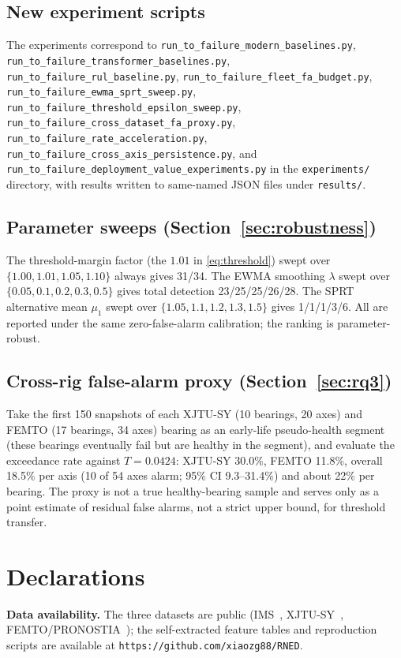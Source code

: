 \documentclass[journal]{IEEEtran}
\begin{document}
\subsection*{New experiment scripts}
The experiments correspond to \texttt{run\_to\_failure\_modern\_baselines.py}, \texttt{run\_to\_failure\_transformer\_baselines.py}, \texttt{run\_to\_failure\_rul\_baseline.py}, \texttt{run\_to\_failure\_fleet\_fa\_budget.py}, \texttt{run\_to\_failure\_ewma\_sprt\_sweep.py}, \texttt{run\_to\_failure\_threshold\_epsilon\_sweep.py}, \texttt{run\_to\_failure\_cross\_dataset\_fa\_proxy.py}, \texttt{run\_to\_failure\_rate\_acceleration.py}, \texttt{run\_to\_failure\_cross\_axis\_persistence.py}, and \texttt{run\_to\_failure\_deployment\_value\_experiments.py} in the \texttt{experiments/} directory, with results written to same-named JSON files under \texttt{results/}.

\subsection*{Parameter sweeps (Section~\ref{sec:robustness})}
The threshold-margin factor (the $1.01$ in \eqref{eq:threshold}) swept over $\{1.00,1.01,1.05,1.10\}$ always gives 31/34. The EWMA smoothing $\lambda$ swept over $\{0.05,0.1,0.2,0.3,0.5\}$ gives total detection 23/25/25/26/28. The SPRT alternative mean $\mu_1$ swept over $\{1.05,1.1,1.2,1.3,1.5\}$ gives 1/1/1/3/6. All are reported under the same zero-false-alarm calibration; the ranking is parameter-robust.

\subsection*{Cross-rig false-alarm proxy (Section~\ref{sec:rq3})}
Take the first 150 snapshots of each XJTU-SY (10 bearings, 20 axes) and FEMTO (17 bearings, 34 axes) bearing as an early-life pseudo-health segment (these bearings eventually fail but are healthy in the segment), and evaluate the exceedance rate against $T=0.0424$: XJTU-SY 30.0\%, FEMTO 11.8\%, overall 18.5\% per axis (10 of 54 axes alarm; 95\% CI 9.3--31.4\%) and about 22\% per bearing. The proxy is not a true healthy-bearing sample and serves only as a point estimate of residual false alarms, not a strict upper bound, for threshold transfer.

\section*{Declarations}
\textbf{Data availability.} The three datasets are public (IMS~\cite{lee2007}, XJTU-SY~\cite{wang2020}, FEMTO/PRONOSTIA~\cite{nectoux2012}); the self-extracted feature tables and reproduction scripts are available at \texttt{https://github.com/xiaozg88/RNED}.
\end{document}
